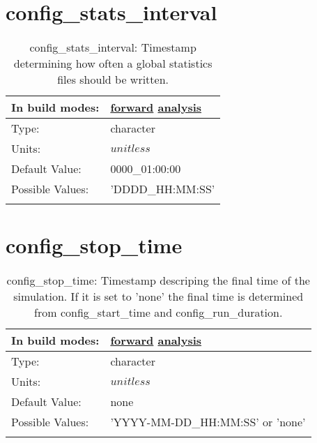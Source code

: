 \section[config\_stats\_interval]{config\_stats\_interval}
\label{sec:nm_sec_config_stats_interval}
\begin{center}
\begin{longtable}{| p{2.0in} || p{4.0in} |}
    \hline
    In build modes: & \hyperref[subsec:forward_nm_tab_io]{forward} \hyperref[subsec:analysis_nm_tab_io]{analysis} \\
    \hline
    Type: & character \\
    \hline
    Units: & $unitless$ \\
    \hline
    Default Value: & 0000\_01:00:00 \\
    \hline
    Possible Values: & 'DDDD\_HH:MM:SS' \\
    \hline
    \caption{config\_stats\_interval: Timestamp determining how often a global statistics files should be written.}
\end{longtable}
\end{center}
\section[config\_stop\_time]{config\_stop\_time}
\label{sec:nm_sec_config_stop_time}
\begin{center}
\begin{longtable}{| p{2.0in} || p{4.0in} |}
    \hline
    In build modes: & \hyperref[subsec:forward_nm_tab_time_management]{forward} \hyperref[subsec:analysis_nm_tab_time_management]{analysis} \\
    \hline
    Type: & character \\
    \hline
    Units: & $unitless$ \\
    \hline
    Default Value: & none \\
    \hline
    Possible Values: & 'YYYY-MM-DD\_HH:MM:SS' or 'none' \\
    \hline
    \caption{config\_stop\_time: Timestamp descriping the final time of the simulation. If it is set to 'none' the final time is determined from config\_start\_time and config\_run\_duration.}
\end{longtable}
\end{center}
